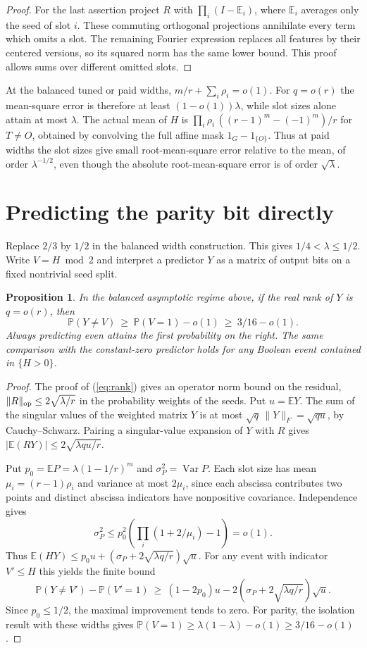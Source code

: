 \documentclass[11pt]{article}
\newtheorem{proposition}{Proposition}
\newcommand{\E}{\mathbb E}
\newcommand{\Prb}{\mathbb P}
\begin{document}
\begin{proof}
For the last assertion project $R$ with
$\prod_i(I-\E_i)$, where $\E_i$ averages only the seed of slot $i$.
These commuting orthogonal projections annihilate every term which
omits a slot. The remaining Fourier expression replaces all features
by their centered versions, so its squared norm has the same lower
bound. This proof allows sums over different omitted slots.
\end{proof}

At the balanced tuned or paid widths,
$m/r+\sum_i\rho_i=o(1)$. For $q=o(r)$ the mean-square error is
therefore at least $(1-o(1))\lambda$, while slot sizes alone attain
at most $\lambda$. The actual mean of $H$ is
$\prod_i\rho_i\,((r-1)^m-(-1)^m)/r$ for $T\ne O$, obtained by
convolving the full affine mask $1_G-1_{\{O\}}$. Thus at paid widths
the slot sizes give small root-mean-square error relative to the
mean, of order $\lambda^{-1/2}$, even though the absolute
root-mean-square error is of order $\sqrt{\lambda}$.

\section{Predicting the parity bit directly}
Replace $2/3$ by $1/2$ in the balanced width construction. This gives
$1/4<\lambda\le1/2$. Write $V=H\bmod 2$ and interpret a predictor
$Y$ as a matrix of output bits on a fixed nontrivial seed split.
\begin{proposition}
In the balanced asymptotic regime above, if the real rank of $Y$
is $q=o(r)$, then
\[
    \Prb(Y\ne V)\ \ge\ \Prb(V=1)-o(1)
             \ \ge\ 3/16-o(1).
\]
Always predicting even attains the first probability on the right.
The same comparison with the constant-zero predictor holds for
any Boolean event contained in $\{H>0\}$.
\end{proposition}
\begin{proof}
The proof of (\ref{eq:rank}) gives an operator norm bound on the
residual, $\|R\|_{\rm op}\le2\sqrt{\lambda/r}$ in the probability
weights of the seeds. Put $u=\E Y$. The sum of the singular values
of the weighted matrix $Y$ is at most $\sqrt q\,\|Y\|_F=\sqrt{qu}$,
by Cauchy--Schwarz. Pairing a singular-value expansion of $Y$ with
$R$ gives $|\E(RY)|\le2\sqrt{\lambda q u/r}$.

Put $p_0=\E P=\lambda(1-1/r)^m$ and $\sigma_P^2=\operatorname{Var}P$.
Each slot size has mean $\mu_i=(r-1)\rho_i$ and variance at most
$2\mu_i$, since each abscissa contributes two points and distinct
abscissa indicators have nonpositive covariance. Independence gives
\[
   \sigma_P^2\le p_0^2\left(\prod_i(1+2/\mu_i)-1\right)=o(1).
\]
Thus $\E(HY)\le p_0u+(\sigma_P+2\sqrt{\lambda q/r})\sqrt{u}$.
For any event with indicator $V'\le H$ this yields the finite bound
\[
 \Prb(Y\ne V')-\Prb(V'=1)
  \ \ge\ (1-2p_0)u
       -2(\sigma_P+2\sqrt{\lambda q/r})\sqrt{u}.
\]
Since $p_0\le1/2$, the maximal improvement tends to zero. For parity,
the isolation result with these widths gives
$\Prb(V=1)\ge\lambda(1-\lambda)-o(1)\ge3/16-o(1)$.
\end{proof}
\end{document}
